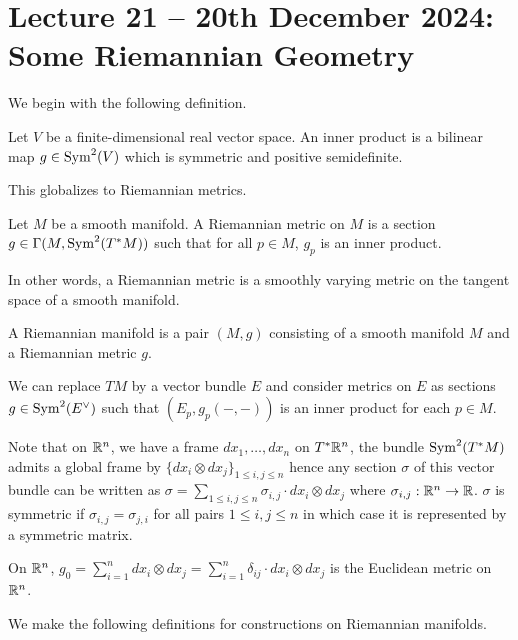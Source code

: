 \section{Lecture 21 -- 20th December 2024: Some Riemannian Geometry}\label{sec: lecture 21}
We begin with the following definition.
\begin{definition}\label{def: inner product}
    Let $V$ be a finite-dimensional real vector space. An inner product is a bilinear map $g\in\mathrm{Sym}^{2}(V)$ which is symmetric and positive semidefinite. 
\end{definition}
This globalizes to Riemannian metrics. 
\begin{definition}\label{def: Riemannian metric}
    Let $M$ be a smooth manifold. A Riemannian metric on $M$ is a section $g\in\Gamma(M,\mathrm{Sym}^{2}(T^{*}M))$ such that for all $p\in M$, $g_{p}$ is an inner product. 
\end{definition}
In other words, a Riemannian metric is a smoothly varying metric on the tangent space of a smooth manifold. 
\begin{definition}\label{def: Riemannian manifold}
    A Riemannian manifold is a pair $(M,g)$ consisting of a smooth manifold $M$ and a Riemannian metric $g$. 
\end{definition}
\begin{remark}
    We can replace $TM$ by a vector bundle $E$ and consider metrics on $E$ as sections $g\in\mathrm{Sym}^{2}(E^{\vee})$ such that $(E_{p},g_{p}(-,-))$ is an inner product for each $p\in M$. 
\end{remark}
Note that on $\mathbb{R}^{n}$, we have a frame $dx_{1},\dots,dx_{n}$ on $T^{*}\mathbb{R}^{n}$, the bundle $\mathrm{Sym}^{2}(T^{*}M)$ admits a global frame by $\{dx_{i}\otimes dx_{j}\}_{1\leq i,j\leq n}$ hence any section $\sigma$ of this vector bundle can be written as $\sigma=\sum_{1\leq i,j\leq n}\sigma_{i,j}\cdot dx_{i}\otimes dx_{j}$ where $\sigma_{i,j}:\mathbb{R}^{n}\to\mathbb{R}$. $\sigma$ is symmetric if $\sigma_{i,j}=\sigma_{j,i}$ for all pairs $1\leq i,j\leq n$ in which case it is represented by a symmetric matrix. 
\begin{example}\label{ex: Euclidean metric on Rn}
    On $\mathbb{R}^{n}$, $g_{0}=\sum_{i=1}^{n}dx_{i}\otimes dx_{j}=\sum_{i=1}^{n}\delta_{ij}\cdot dx_{i}\otimes dx_{j}$ is the Euclidean metric on $\mathbb{R}^{n}$. 
\end{example}
We make the following definitions for constructions on Riemannian manifolds. 
